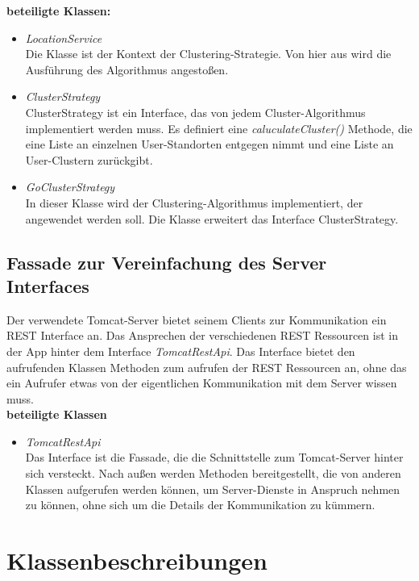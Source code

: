 \documentclass[11pt,a4paper]{report}
\begin{document}
\textbf{beteiligte Klassen:}
\begin{itemize}
	\item \textit{LocationService} \\
	Die Klasse ist der Kontext der Clustering-Strategie. Von hier aus wird die Ausführung des Algorithmus angestoßen.
	\item \textit{ClusterStrategy} \\
	ClusterStrategy ist ein Interface, das von jedem Cluster-Algorithmus implementiert werden muss. Es definiert eine \textit{caluculateCluster()} Methode, die eine Liste an einzelnen User-Standorten entgegen nimmt und eine Liste an User-Clustern zurückgibt.
	\item \textit{GoClusterStrategy} \\
	In dieser Klasse wird der Clustering-Algorithmus implementiert, der angewendet werden soll. Die Klasse erweitert das Interface ClusterStrategy.
\end{itemize}

\subsection{Fassade zur Vereinfachung des Server Interfaces}
Der verwendete Tomcat-Server bietet seinem Clients zur Kommunikation ein REST Interface an. Das Ansprechen der verschiedenen REST Ressourcen ist in der App hinter dem Interface \textit{TomcatRestApi}. Das Interface bietet den aufrufenden Klassen Methoden zum aufrufen der REST Ressourcen an, ohne das ein Aufrufer etwas von der eigentlichen Kommunikation mit dem Server wissen muss. \\

\textbf{beteiligte Klassen}
\begin{itemize}
	\item \textit{TomcatRestApi} \\
	Das Interface ist die Fassade, die die Schnittstelle zum Tomcat-Server hinter sich versteckt. Nach außen werden Methoden bereitgestellt, die von anderen Klassen aufgerufen werden können, um Server-Dienste in Anspruch nehmen zu können, ohne sich um die Details der Kommunikation zu kümmern.
\end{itemize}

\section{Klassenbeschreibungen}

\end{document}
